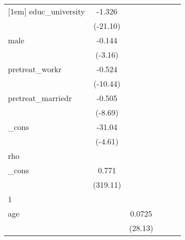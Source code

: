 {\begin{tabular}{l*{5}{c}}
[1em]
educ\_university&      -1.326\sym{***}&                     &                     &                     &                     \\
            &    (-21.10)         &                     &                     &                     &                     \\
[1em]
male        &      -0.144\sym{**} &                     &                     &                     &                     \\
            &     (-3.16)         &                     &                     &                     &                     \\
[1em]
pretreat\_workr&      -0.524\sym{***}&                     &                     &                     &                     \\
            &    (-10.44)         &                     &                     &                     &                     \\
[1em]
pretreat\_marriedr&      -0.505\sym{***}&                     &                     &                     &                     \\
            &     (-8.69)         &                     &                     &                     &                     \\
[1em]
\_cons      &      -31.04\sym{***}&                     &                     &                     &                     \\
            &     (-4.61)         &                     &                     &                     &                     \\
\hline
rho         &                     &                     &                     &                     &                     \\
\_cons      &       0.771\sym{***}&                     &                     &                     &                     \\
            &    (319.11)         &                     &                     &                     &                     \\
\hline
1           &                     &                     &                     &                     &                     \\
age         &                     &      0.0725\sym{***}&                     &                     &                     \\
            &                     &     (28.13)         &                     &                     &                     \\

\end{tabular}}

